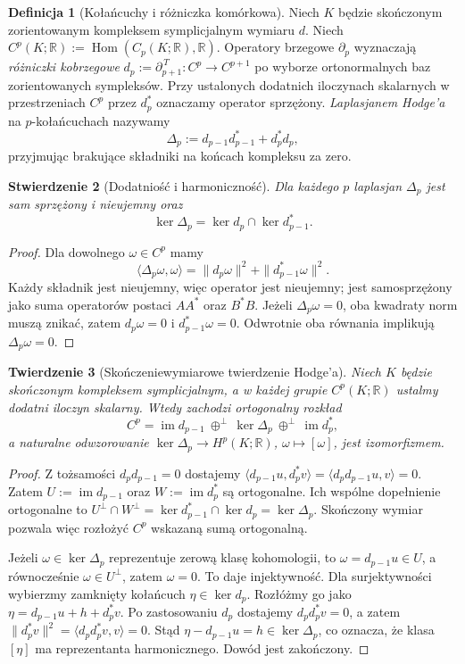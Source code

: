 \documentclass[11pt,a4paper]{report}
\numberwithin{equation}{section}
\theoremstyle{plain}
\newtheorem{twierdzenie}{Twierdzenie}[section]
\newtheorem{stwierdzenie}[twierdzenie]{Stwierdzenie}
\theoremstyle{definition}
\newtheorem{definicja}[twierdzenie]{Definicja}
\theoremstyle{remark}
\begin{document}
\begin{definicja}[Kołańcuchy i różniczka komórkowa]
Niech $K$ będzie skończonym zorientowanym
kompleksem symplicjalnym wymiaru $d$. Niech
$C^p(K;\mathbb R):=\operatorname{Hom}(C_p(K;\mathbb R),\mathbb R)$.
Operatory brzegowe $\partial_p$ wyznaczają
\emph{różniczki kobrzegowe}
$d_p:=\partial_{p+1}^{\,T}:C^p\to C^{p+1}$
po wyborze ortonormalnych baz zorientowanych sympleksów.
Przy ustalonych dodatnich iloczynach skalarnych
w przestrzeniach $C^p$ przez $d_p^*$ oznaczamy
operator sprzężony. \emph{Laplasjanem Hodge'a}
na $p$-kołańcuchach nazywamy
\[
\Delta_p:=d_{p-1}d_{p-1}^*+d_p^*d_p,
\]
przyjmując brakujące składniki na końcach
kompleksu za zero.
\end{definicja}

\begin{stwierdzenie}[Dodatniość i harmoniczność]
Dla każdego $p$ laplasjan $\Delta_p$ jest
sam sprzężony i nieujemny oraz
\[
\ker\Delta_p=\ker d_p\cap\ker d_{p-1}^*.
\]
\end{stwierdzenie}

\begin{proof}
Dla dowolnego $\omega\in C^p$ mamy
\[
\langle\Delta_p\omega,\omega\rangle
=\|d_p\omega\|^2+\|d_{p-1}^*\omega\|^2.
\]
Każdy składnik jest nieujemny, więc operator jest
nieujemny; jest samosprzężony jako suma operatorów
postaci $AA^*$ oraz $B^*B$. Jeżeli $\Delta_p\omega=0$,
oba kwadraty norm muszą znikać, zatem
$d_p\omega=0$ i $d_{p-1}^*\omega=0$.
Odwrotnie oba równania implikują
$\Delta_p\omega=0$.
\end{proof}

\begin{twierdzenie}[Skończeniewymiarowe twierdzenie Hodge'a]
\label{thm:tg-finite-hodge}
Niech $K$ będzie skończonym kompleksem symplicjalnym,
a w każdej grupie $C^p(K;\mathbb R)$ ustalmy dodatni
iloczyn skalarny. Wtedy zachodzi ortogonalny rozkład
\[
C^p=\operatorname{im}d_{p-1}
\ \oplus^{\perp}\ \ker\Delta_p
\ \oplus^{\perp}\ \operatorname{im}d_p^*,
\]
a naturalne odwzorowanie
$\ker\Delta_p\to H^p(K;\mathbb R)$,
$\omega\mapsto[\omega]$, jest izomorfizmem.
\end{twierdzenie}

\begin{proof}
Z tożsamości $d_pd_{p-1}=0$ dostajemy
$\langle d_{p-1}u,d_p^*v\rangle
=\langle d_pd_{p-1}u,v\rangle=0$.
Zatem $U:=\operatorname{im}d_{p-1}$ oraz
$W:=\operatorname{im}d_p^*$ są ortogonalne.
Ich wspólne dopełnienie ortogonalne to
$U^\perp\cap W^\perp
=\ker d_{p-1}^*\cap\ker d_p=\ker\Delta_p$.
Skończony wymiar pozwala więc rozłożyć $C^p$
wskazaną sumą ortogonalną.

Jeżeli $\omega\in\ker\Delta_p$ reprezentuje zerową
klasę kohomologii, to $\omega=d_{p-1}u\in U$,
a równocześnie $\omega\in U^\perp$, zatem $\omega=0$.
To daje injektywność. Dla surjektywności wybierzmy
zamknięty kołańcuch $\eta\in\ker d_p$. Rozłóżmy go
jako $\eta=d_{p-1}u+h+d_p^*v$.
Po zastosowaniu $d_p$ dostajemy $d_pd_p^*v=0$,
a zatem $\|d_p^*v\|^2
=\langle d_pd_p^*v,v\rangle=0$.
Stąd $\eta-d_{p-1}u=h\in\ker\Delta_p$,
co oznacza, że klasa $[\eta]$ ma reprezentanta
harmonicznego. Dowód jest zakończony.
\end{proof}
\end{document}
